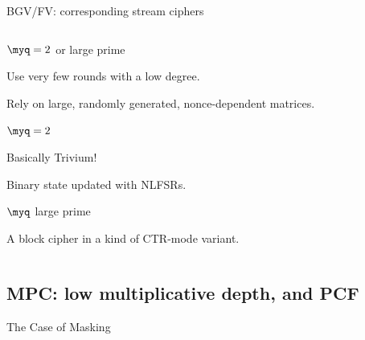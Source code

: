 \documentclass[presentation,aspectratio=1610]{beamer}
\begin{document}
\begin{frame}{BGV/FV: corresponding stream ciphers}
  
  \begin{columns}
    \begin{column}{0.5\textwidth}
      \begin{description}
        \setlength\itemsep{0.3cm}
      \item<1->[$\cdot$ASTA] $\myq = 2$ or large prime

        {\small Use very few rounds with a low degree.

          Rely on large, randomly generated, nonce-dependent matrices.}
          
      \item<2->[``Kreyvium''] \cite{FSE:CCFLNP16} $\myq = 2$

        {\small Basically Trivium!

          Binary state updated with NLFSRs.}
          
                
    \item<3->[HERA] \cite{AC:CHKLLL21} $\myq$ large prime 

        {\small A block cipher in a kind of CTR-mode variant.}
      \end{description}
    \end{column}
    \hfill
    \begin{column}{0.45\textwidth}
    \end{column}
  \end{columns}
\end{frame}


\subsection{MPC: low multiplicative depth, and PCF}

\begin{frame}{The Case of Masking}
\end{frame}
\end{document}
